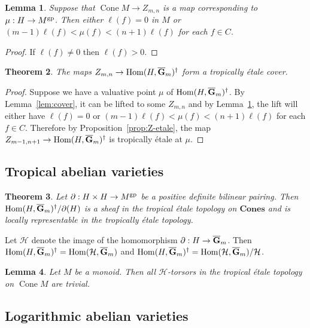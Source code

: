 \documentclass[12pt]{amsart}
\newtheorem{theorem}{Theorem}
\newtheorem{lemma}[theorem]{Lemma}
\theoremstyle{definition}
\theoremstyle{remark}
\def\Hom{\operatorname{Hom}}
\def\Cone{\operatorname{Cone}}
\def\Cones{\mathbf{Cones}}
\def\overnorm#1{\overline{#1}\vphantom{#1}}
\def\ologGm{\overnorm{\mathbf G}_m}
\begin{document}
\begin{lemma} \label{lem:add-one}
Suppose that $\Cone M \to Z_{m,n}$ is a map corresponding to $\mu : H \to M^{\rm gp}$.  Then either $\ell(f) = 0$ in $M$ or $(m-1) \ell(f) < \mu(f) < (n+1) \ell(f)$ for each $f \in C$.
\end{lemma}
\begin{proof}
If $\ell(f) \neq 0$ then $\ell(f) > 0$.
\end{proof}

\begin{theorem}
The maps $Z_{m,n} \to \Hom(H, \ologGm)^\dagger$ form a tropically \'etale cover.
\end{theorem}
\begin{proof}
Suppose we have a valuative point $\mu$ of $\Hom(H, \ologGm)^\dagger$.  By Lemma~\ref{lem:cover}, it can be lifted to some $Z_{m,n}$ and by Lemma~\ref{lem:add-one}, the lift will either have $\ell(f) = 0$ or $(m-1) \ell(f) < \mu(f) < (n+1) \ell(f)$ for each $f \in C$.  Therefore by Proposition~\ref{prop:Z-etale}, the map $Z_{m-1,n+1} \to \Hom(H, \ologGm)^\dagger$ is tropically \'etale at $\mu$.
\end{proof}

\subsection{Tropical abelian varieties}

\begin{theorem}
Let $\partial : H \times H \to M^{\rm gp}$ be a positive definite bilinear pairing.  Then $\Hom(H, \ologGm)^\dagger / \partial(H)$ is a sheaf in the tropical \'etale topology on $\Cones$ and is locally representable in the tropically \'etale topology.
\end{theorem}

Let $\mathcal H$ denote the image of the homomorphism $\partial : H \to \ologGm$.  Then $\Hom(H, \ologGm)^\dagger = \Hom(\mathcal H, \ologGm)$ and $\Hom(H, \ologGm)^\dagger = \Hom(\mathcal H, \ologGm) / \mathcal H$.

\begin{lemma}
Let $M$ be a monoid.  Then all $\mathcal H$-torsors in the tropical \'etale topology on $\Cone M$ are trivial.
\end{lemma}


\subsection{Logarithmic abelian varieties}
\end{document}
